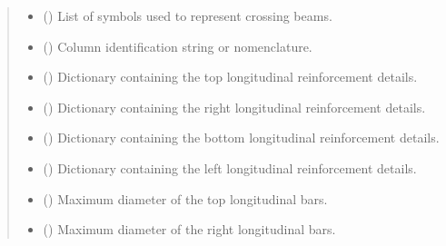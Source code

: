 \documentclass[a4paper,10pt,english]{sphinxmanual}
\begin{document}
\begin{fulllineitems}
\begin{quote}
\begin{description}
\begin{itemize}
\item {} 
\sphinxAtStartPar
{} (\sphinxstyleliteralemphasis{\sphinxupquote{, }}) \textendash{} List of symbols used to represent crossing beams.

\item {} 
\sphinxAtStartPar
{} (\sphinxstyleliteralemphasis{\sphinxupquote{, }}) \textendash{} Column identification string or nomenclature.

\end{itemize}

\begin{itemize}
\item {} 
\sphinxAtStartPar
{} () \textendash{} Dictionary containing the top longitudinal reinforcement details.

\item {} 
\sphinxAtStartPar
{} () \textendash{} Dictionary containing the right longitudinal reinforcement details.

\item {} 
\sphinxAtStartPar
{} () \textendash{} Dictionary containing the bottom longitudinal reinforcement details.

\item {} 
\sphinxAtStartPar
{} () \textendash{} Dictionary containing the left longitudinal reinforcement details.

\item {} 
\sphinxAtStartPar
{} () \textendash{} Maximum diameter of the top longitudinal bars.

\item {} 
\sphinxAtStartPar
{} () \textendash{} Maximum diameter of the right longitudinal bars.


\end{itemize}
\end{description}
\end{quote}
\end{fulllineitems}
\end{document}
